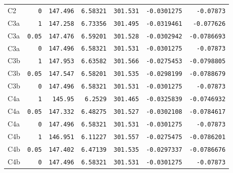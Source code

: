 \begin{longtable}{lrrrrrr}
C2 & \texttt{0} & \texttt{147.496} & \texttt{6.58321} & \texttt{301.531} & \texttt{-0.0301275} & \texttt{-0.07873} \\
C3a & \texttt{1} & \texttt{147.258} & \texttt{6.73356} & \texttt{301.495} & \texttt{-0.0319461} & \texttt{-0.077626} \\
C3a & \texttt{0.05} & \texttt{147.476} & \texttt{6.59201} & \texttt{301.528} & \texttt{-0.0302942} & \texttt{-0.0786693} \\
C3a & \texttt{0} & \texttt{147.496} & \texttt{6.58321} & \texttt{301.531} & \texttt{-0.0301275} & \texttt{-0.07873} \\
C3b & \texttt{1} & \texttt{147.953} & \texttt{6.63582} & \texttt{301.566} & \texttt{-0.0275453} & \texttt{-0.0798805} \\
C3b & \texttt{0.05} & \texttt{147.547} & \texttt{6.58201} & \texttt{301.535} & \texttt{-0.0298199} & \texttt{-0.0788679} \\
C3b & \texttt{0} & \texttt{147.496} & \texttt{6.58321} & \texttt{301.531} & \texttt{-0.0301275} & \texttt{-0.07873} \\
C4a & \texttt{1} & \texttt{145.95} & \texttt{6.2529} & \texttt{301.465} & \texttt{-0.0325839} & \texttt{-0.0746932} \\
C4a & \texttt{0.05} & \texttt{147.332} & \texttt{6.48275} & \texttt{301.527} & \texttt{-0.0302108} & \texttt{-0.0784617} \\
C4a & \texttt{0} & \texttt{147.496} & \texttt{6.58321} & \texttt{301.531} & \texttt{-0.0301275} & \texttt{-0.07873} \\
C4b & \texttt{1} & \texttt{146.951} & \texttt{6.11227} & \texttt{301.557} & \texttt{-0.0275475} & \texttt{-0.0786201} \\
C4b & \texttt{0.05} & \texttt{147.402} & \texttt{6.47139} & \texttt{301.535} & \texttt{-0.0297337} & \texttt{-0.0786676} \\
C4b & \texttt{0} & \texttt{147.496} & \texttt{6.58321} & \texttt{301.531} & \texttt{-0.0301275} & \texttt{-0.07873} \\
\end{longtable}
\endgroup


